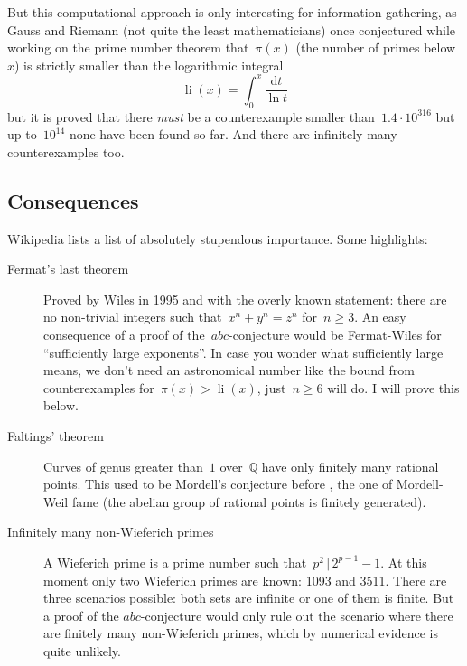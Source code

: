 \documentclass[11pt, a4paper, openany, oneside, article]{memoir}
\theoremstyle{definition}
\begin{document}
But this computational approach is only interesting for information gathering, as Gauss and Riemann (not quite the least mathematicians) once conjectured while working on the prime number theorem that~$\pi(x)$ (the number of primes below~$x$) is strictly smaller than the logarithmic integral
\begin{equation}
  \operatorname{li}(x)=\int_0^x\frac{\mathrm{d}t}{\ln t}
\end{equation}
but it is proved that there \emph{must} be a counterexample smaller than~$1.4\cdot10^{316}$ but up to~$10^{14}$ none have been found so far. And there are infinitely many counterexamples too.

\subsection{Consequences}

Wikipedia lists a list of absolutely stupendous importance. Some highlights:

\begin{description}
  \item[Fermat's last theorem] Proved by Wiles in 1995 and with the overly known statement: there are no non-trivial integers such that~$x^n+y^n=z^n$ for~$n\geq 3$. An easy consequence of a proof of the~$abc$\nobreakdash-conjecture would be Fermat-Wiles for ``sufficiently large exponents''. In case you wonder what sufficiently large means, we don't need an astronomical number like the bound from counterexamples for~$\pi(x)>\operatorname{li}(x)$, just~$n\geq 6$ will do. I will prove this below.

  \item[Faltings' theorem] Curves of genus greater than~$1$ over~$\mathbb{Q}$ have only finitely many rational points. This used to be Mordell's conjecture before , the one of Mordell-Weil fame (the abelian group of rational points is finitely generated).

  \item[Infinitely many non-Wieferich primes] A Wieferich prime is a prime number such that~$p^2\,|\, 2^{p-1}-1$. At this moment only two Wieferich primes are known: 1093 and 3511. There are three scenarios possible: both sets are infinite or one of them is finite. But a proof of the $abc$\nobreakdash-conjecture would only rule out the scenario where there are finitely many non-Wieferich primes, which by numerical evidence is quite unlikely.
\end{description}
\end{document}
